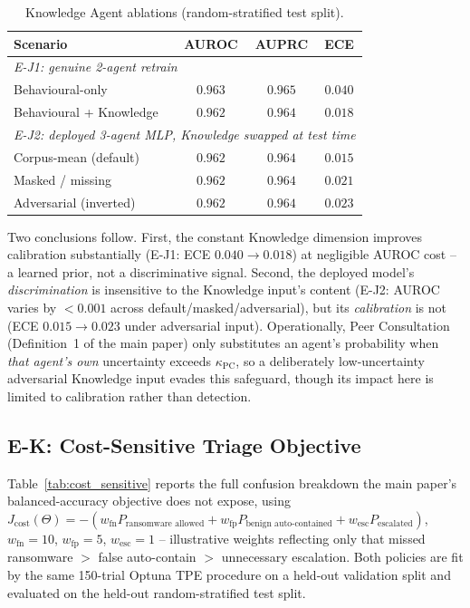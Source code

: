 \documentclass[journal]{IEEEtran}
\begin{document}
\begin{table}[h]
\centering
\footnotesize
\caption{Knowledge Agent ablations (random-stratified test split).}
\label{tab:knowledge_ablation}
\setlength{\tabcolsep}{4pt}
\begin{tabular}{lccc}
\toprule
Scenario & AUROC & AUPRC & ECE \\
\midrule
\multicolumn{4}{l}{\textit{E-J1: genuine 2-agent retrain}} \\
Behavioural-only            & $0.963$ & $0.965$ & $0.040$ \\
Behavioural + Knowledge     & $0.962$ & $0.964$ & $\mathbf{0.018}$ \\
\midrule
\multicolumn{4}{l}{\textit{E-J2: deployed 3-agent MLP, Knowledge swapped at test time}} \\
Corpus-mean (default)       & $\mathbf{0.962}$ & $\mathbf{0.964}$ & $\mathbf{0.015}$ \\
Masked / missing            & $0.962$ & $0.964$ & $0.021$ \\
Adversarial (inverted)      & $0.962$ & $0.964$ & $0.023$ \\
\bottomrule
\end{tabular}
\end{table}

Two conclusions follow. First, the constant Knowledge dimension improves
calibration substantially (E-J1: ECE $0.040 \to 0.018$) at negligible
AUROC cost -- a learned prior, not a discriminative signal. Second, the
deployed model's \emph{discrimination} is insensitive to the Knowledge
input's content (E-J2: AUROC varies by $<0.001$ across
default/masked/adversarial), but its \emph{calibration} is not (ECE
$0.015 \to 0.023$ under adversarial input). Operationally, Peer
Consultation (Definition~1 of the main paper) only substitutes an
agent's probability when \emph{that agent's own} uncertainty exceeds
$\kappa_{\text{PC}}$, so a deliberately low-uncertainty adversarial
Knowledge input evades this safeguard, though its impact here is
limited to calibration rather than detection.

\subsection{E-K: Cost-Sensitive Triage Objective}\label{sec:supp_cost}

Table~\ref{tab:cost_sensitive} reports the full confusion breakdown the
main paper's balanced-accuracy objective does not expose, using
$J_{\text{cost}}(\Theta) = -(w_{\text{fn}} P_{\text{ransomware allowed}} +
w_{\text{fp}} P_{\text{benign auto-contained}} + w_{\text{esc}}
P_{\text{escalated}})$, $w_{\text{fn}}{=}10$, $w_{\text{fp}}{=}5$,
$w_{\text{esc}}{=}1$ -- illustrative weights reflecting only that missed
ransomware $>$ false auto-contain $>$ unnecessary escalation. Both
policies are fit by the same 150-trial Optuna TPE procedure on a
held-out validation split and evaluated on the held-out
random-stratified test split.
\end{document}
